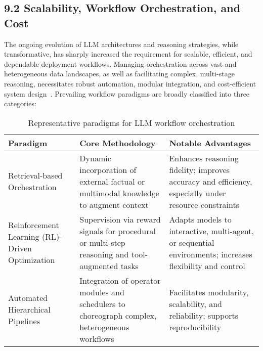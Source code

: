 \documentclass[11pt]{article}
\begin{document}
\subsection{9.2 Scalability, Workflow Orchestration, and Cost}

The ongoing evolution of LLM architectures and reasoning strategies, while transformative, has sharply increased the requirement for scalable, efficient, and dependable deployment workflows. Managing orchestration across vast and heterogeneous data landscapes, as well as facilitating complex, multi-stage reasoning, necessitates robust automation, modular integration, and cost-efficient system design~\cite{ref:5,ref:8,ref:9,ref:12,ref:37,ref:43,ref:50,ref:55,ref:57,ref:60,ref:64,ref:79,ref:80,ref:86,ref:88,ref:89,ref:104}. Prevailing workflow paradigms are broadly classified into three categories:

\begin{table}[ht]
    \centering
    \caption{Representative paradigms for LLM workflow orchestration}
    \label{tab:workflow_paradigms}
    \begin{tabular}{|p{4cm}|p{5cm}|p{5cm}|}
        \hline
        \textbf{Paradigm} & \textbf{Core Methodology} & \textbf{Notable Advantages} \\
        \hline
        Retrieval-based Orchestration & Dynamic incorporation of external factual or multimodal knowledge to augment context & Enhances reasoning fidelity; improves accuracy and efficiency, especially under resource constraints~\cite{ref:5,ref:50,ref:79,ref:80} \\
        \hline
        Reinforcement Learning (RL)-Driven Optimization & Supervision via reward signals for procedural or multi-step reasoning and tool-augmented tasks & Adapts models to interactive, multi-agent, or sequential environments; increases flexibility and control~\cite{ref:8,ref:9,ref:12,ref:37,ref:55,ref:60,ref:64,ref:86} \\
        \hline
        Automated Hierarchical Pipelines & Integration of operator modules and schedulers to choreograph complex, heterogeneous workflows & Facilitates modularity, scalability, and reliability; supports reproducibility~\cite{ref:12,ref:64,ref:86,ref:79} \\
        \hline
    \end{tabular}
\end{table}
\end{document}

